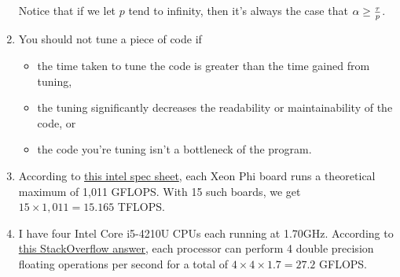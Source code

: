 \documentclass{hw}
\begin{document}
\begin{enumerate}
    Notice that if we let $p$ tend to infinity, then it's always the case that
    $\alpha \geq \frac{\tau}{p}{}$.

  \item You should not tune a piece of code if
    \begin{itemize}
      \item the time taken to tune the code is greater than the time gained
        from tuning,
      \item the tuning significantly decreases the readability or
        maintainability of the code, or
      \item the code you're tuning isn't a bottleneck of the program.
    \end{itemize}

  \item According to
    \href{http://www.intel.com/content/www/us/en/benchmarks/server/xeon-phi/xeon-phi-theoretical-maximums.html}{this
    intel spec sheet}, each Xeon Phi board runs a theoretical maximum of 1,011
    GFLOPS. With 15 such boards, we get $15 \times 1,011 = 15.165$ TFLOPS.

  \item
    I have four Intel Core i5-4210U CPUs each running at 1.70GHz. According to
    \href{http://stackoverflow.com/a/15657772/3187068}{this StackOverflow
    answer}, each processor can perform 4 double precision floating operations
    per second for a total of $4 \times 4 \times 1.7 = 27.2$ GFLOPS.
\end{enumerate}
\end{document}
